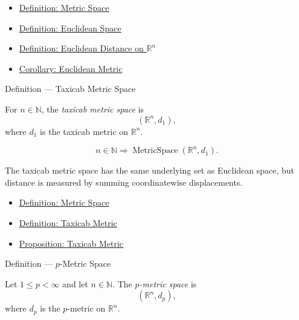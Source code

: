 \begin{dependencies}
\begin{itemize}
  \item \hyperref[def:metric-space]{Definition: Metric Space}
  \item \hyperref[def:euclidean-space]{Definition: Euclidean Space}
  \item \hyperref[def:euclidean-distance-rn]{Definition: Euclidean Distance on \(\mathbb{R}^n\)}
  \item \hyperref[cor:euclidean-metric]{Corollary: Euclidean Metric}
\end{itemize}
\end{dependencies}

\begin{definitionbox}{Definition --- Taxicab Metric Space}
\begin{definition}\label{def:taxicab-metric-space}
For \(n\in\mathbb{N}\), the \emph{taxicab metric space} is
\[
  (\mathbb{R}^n,d_1),
\]
where \(d_1\) is the taxicab metric on \(\mathbb{R}^n\).
\end{definition}
\end{definitionbox}

\begin{remark*}
\[
n\in\mathbb{N}
\Longrightarrow
\operatorname{MetricSpace}(\mathbb{R}^n,d_1).
\]
\end{remark*}

\begin{remark*}[Interpretation]
The taxicab metric space has the same underlying set as Euclidean space, but
distance is measured by summing coordinatewise displacements.
\end{remark*}

\begin{dependencies}
\begin{itemize}
  \item \hyperref[def:metric-space]{Definition: Metric Space}
  \item \hyperref[def:taxicab-metric-rn]{Definition: Taxicab Metric}
  \item \hyperref[prop:taxicab-metric-rn]{Proposition: Taxicab Metric}
\end{itemize}
\end{dependencies}

\begin{definitionbox}{Definition --- \(p\)-Metric Space}
\begin{definition}\label{def:lp-metric-space}
Let \(1\leq p<\infty\) and let \(n\in\mathbb{N}\).  The \emph{\(p\)-metric
space} is
\[
  (\mathbb{R}^n,d_p),
\]
where \(d_p\) is the \(p\)-metric on \(\mathbb{R}^n\).
\end{definition}
\end{definitionbox}

